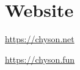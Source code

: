 
\chapter*{Website}

\begin{center}
  \url{https://chyson.net}
  
  \url{https://chyson.fun}
\end{center}